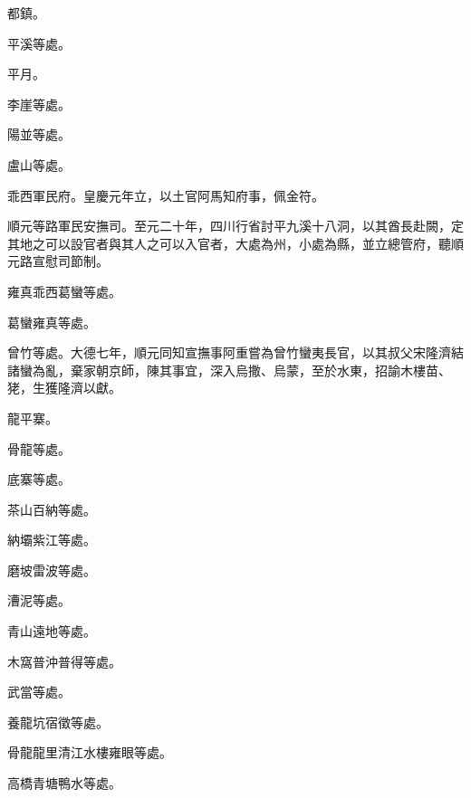 \begin{pinyinscope}
 都鎮。



 平溪等處。



 平月。



 李崖等處。



 陽並等處。



 盧山等處。



 乖西軍民府。皇慶元年立，以土官阿馬知府事，佩金符。



 順元等路軍民安撫司。至元二十年，四川行省討平九溪十八洞，以其酋長赴闕，定其地之可以設官者與其人之可以入官者，大處為州，小處為縣，並立總管府，聽順元路宣慰司節制。



 雍真乖西葛蠻等處。



 葛蠻雍真等處。



 曾竹等處。大德七年，順元同知宣撫事阿重嘗為曾竹蠻夷長官，以其叔父宋隆濟結諸蠻為亂，棄家朝京師，陳其事宜，深入烏撒、烏蒙，至於水東，招諭木樓苗、狫，生獲隆濟以獻。



 龍平寨。



 骨龍等處。



 底寨等處。



 茶山百納等處。



 納壩紫江等處。



 磨坡雷波等處。



 漕泥等處。



 青山遠地等處。



 木窩普沖普得等處。



 武當等處。



 養龍坑宿徵等處。



 骨龍龍里清江水樓雍眼等處。



 高橋青塘鴨水等處。




\end{pinyinscope}
